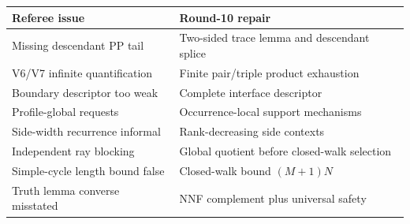 \documentclass[11pt]{article}
\newcommand{\PP}{\mathrm{PP}}
\begin{document}
\begin{center}
\small
\begin{tabular}{p{.42\linewidth}p{.48\linewidth}}
\toprule
Referee issue & Round-10 repair\\\midrule
Missing descendant $\PP$ tail & Two-sided trace lemma and descendant splice\\
V6/V7 infinite quantification & Finite pair/triple product exhaustion\\
Boundary descriptor too weak & Complete interface descriptor\\
Profile-global requests & Occurrence-local support mechanisms\\
Side-width recurrence informal & Rank-decreasing side contexts\\
Independent ray blocking & Global quotient before closed-walk selection\\
Simple-cycle length bound false & Closed-walk bound $(M+1)N$\\
Truth lemma converse misstated & NNF complement plus universal safety\\
\bottomrule
\end{tabular}
\end{center}
\end{document}
